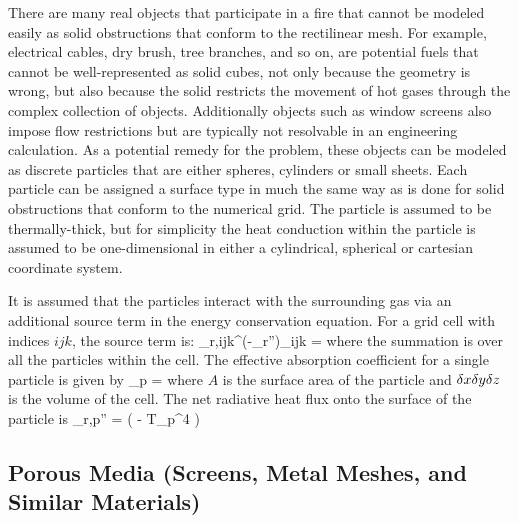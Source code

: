 There are many real objects that participate in a fire that cannot be modeled easily as solid obstructions that conform
to the rectilinear mesh. For example, electrical cables, dry brush, tree branches, and so on, are potential fuels that cannot
be well-represented as solid cubes, not only because the geometry is wrong, but also because the solid restricts the
movement of hot gases through the complex collection of objects.  Additionally objects such as window screens also impose flow restrictions but are typically not resolvable in an engineering calculation. As a potential remedy for the problem, these objects can
be modeled as discrete particles that are either spheres, cylinders or small sheets. Each particle can be assigned a surface
type in much the same way as is done for solid obstructions that conform to the numerical grid. The particle is assumed to be
thermally-thick, but for simplicity the heat conduction within the particle is assumed to be one-dimensional in either
a cylindrical, spherical or cartesian coordinate system.

It is assumed that the particles interact with the surrounding gas via an additional source term in the energy conservation
equation. For a grid cell with indices $ijk$, the source term is:
\be \dq_{r,ijk}^\ppp \equiv (-\nabla\!\cdot \dot{\bq}_r'')_{ijk} = \sum {} \ee
where the summation is over all the particles within the cell. The effective absorption coefficient for a single particle is given by
\be \kappa_p =  \ee
where $A$ is the surface area of the particle and $\delta x \delta y \delta z$ is the volume of the cell.
The net radiative heat flux onto the surface of the particle is
\be \dq_{r,p}'' = \epsilon \left(  - \sigma T_p^4 \right) \ee

\subsection{Porous Media (Screens, Metal Meshes, and Similar Materials)}

